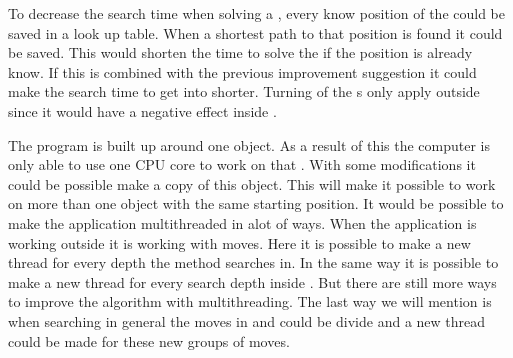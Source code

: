 	
To decrease the search time when solving a \rubik{}, every know position of the \rubik{} could be saved in a look up table.
When a shortest path to that position is found it could be saved.
This would shorten the time to solve the \rubik{} if the position is already know.
If this is combined with the previous improvement suggestion it could make the search time to get into  shorter.
Turning of the \face{}s only apply outside  since it would have a negative effect inside . 
	 
The program is built up around one \cube{} object.
As a result of this the computer is only able to use one CPU core to work on that \cube{}.
With some modifications it could be possible make a copy of this \cube{} object.
This will make it possible to work on more than one \cube{} object with the same starting position.
It would be possible to make the application multithreaded in alot of ways.
When the application is working outside  it is working with  moves.
Here it is possible to make a new thread for every depth the method searches in.
In the same way it is possible to make a new thread for every search depth inside .
But there are still more ways to improve the algorithm with multithreading.
The last way we will mention is when searching in general the moves in  and  could be divide and a new thread could be made for these new groups of moves.